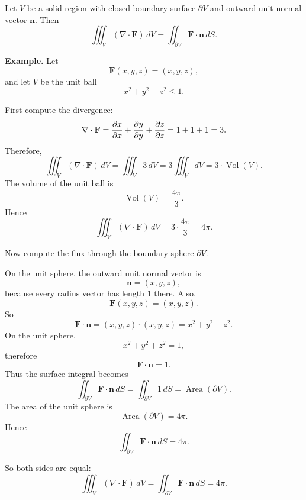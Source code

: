 \documentclass[a4paper,12pt]{letter}
\begin{document}
Let $V$ be a solid region with closed boundary surface $\partial V$ and outward unit normal vector $\mathbf{n}$. Then
$$\iiint_V (\nabla\cdot\mathbf{F})\,dV
=
\iint_{\partial V}\mathbf{F}\cdot\mathbf{n}\,dS.$$

\textbf{Example.} Let
$$\mathbf{F}(x,y,z)=(x,y,z),$$
and let $V$ be the unit ball
$$x^2+y^2+z^2\le 1.$$

First compute the divergence:
$$\nabla\cdot\mathbf{F}
=
\pdv{x}{x}+\pdv{y}{y}+\pdv{z}{z}
=
1+1+1
=
3.$$
Therefore,
$$\iiint_V (\nabla\cdot\mathbf{F})\,dV
=
\iiint_V 3\,dV
=
3\iiint_V dV
=
3\cdot \operatorname{Vol}(V).$$
The volume of the unit ball is
$$\operatorname{Vol}(V)=\frac{4\pi}{3}.$$
Hence
$$\iiint_V (\nabla\cdot\mathbf{F})\,dV
=
3\cdot\frac{4\pi}{3}
=
4\pi.$$

Now compute the flux through the boundary sphere $\partial V$.

On the unit sphere, the outward unit normal vector is
$$\mathbf{n}=(x,y,z),$$
because every radius vector has length $1$ there.
Also,
$$\mathbf{F}(x,y,z)=(x,y,z).$$
So
$$\mathbf{F}\cdot\mathbf{n}
=
(x,y,z)\cdot(x,y,z)
=
x^2+y^2+z^2.$$
On the unit sphere,
$$x^2+y^2+z^2=1,$$
therefore
$$\mathbf{F}\cdot\mathbf{n}=1.$$
Thus the surface integral becomes
$$\iint_{\partial V}\mathbf{F}\cdot\mathbf{n}\,dS
=
\iint_{\partial V}1\,dS
=
\operatorname{Area}(\partial V).$$
The area of the unit sphere is
$$\operatorname{Area}(\partial V)=4\pi.$$
Hence
$$\iint_{\partial V}\mathbf{F}\cdot\mathbf{n}\,dS=4\pi.$$

So both sides are equal:
$$\iiint_V (\nabla\cdot\mathbf{F})\,dV
=
\iint_{\partial V}\mathbf{F}\cdot\mathbf{n}\,dS
=
4\pi.$$

\begin{center}
\end{center}
\end{document}
